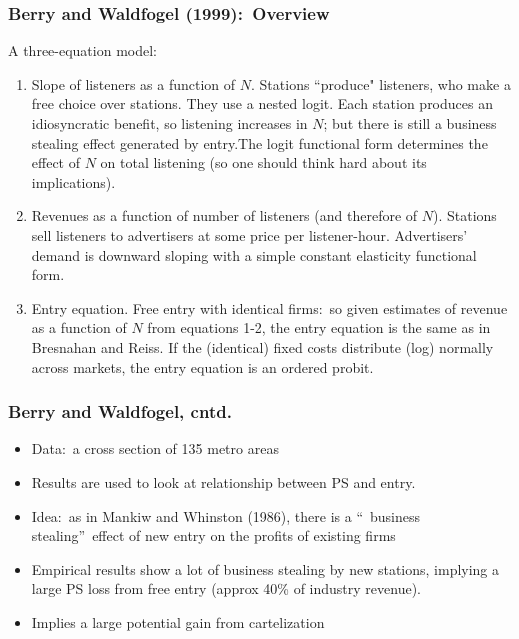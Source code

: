 \documentclass[aspectratio=169,11pt]{beamer}
\begin{document}
\begin{frame}
\frametitle{Berry and Waldfogel (1999):\ Overview}

A three-equation model:

\begin{enumerate}
\item Slope of listeners as a function of $N.$ Stations ``produce" listeners,
who make a free choice over stations. They use a nested logit. Each station
produces an idiosyncratic benefit, so listening increases in $N$; but there
is still a business stealing effect generated by entry.The logit functional
form determines the effect of $N$ on total listening (so one should think
hard about its implications).

\item Revenues as a function of number of listeners (and therefore of $N$).
Stations sell listeners to advertisers at some price per listener-hour.
Advertisers' demand is downward sloping with a simple constant elasticity
functional form.

\item Entry equation. Free entry with identical firms:\ so given estimates
of revenue as a function of $N$ from equations 1-2, the entry equation is
the same as in Bresnahan and Reiss. If the
(identical) fixed costs distribute (log) normally across markets, the entry
equation is an ordered probit.
\end{enumerate}
\end{frame}



\begin{frame}
\frametitle{Berry and Waldfogel, cntd.}
\begin{itemize}
\item Data:\ a cross section of 135 metro areas
\item Results are used to look at relationship between PS and entry.
\item Idea:\ as in Mankiw and Whinston (1986), there is a \textquotedblleft\
business stealing\textquotedblright\ effect of new entry on the profits of
existing firms
\item Empirical results show a lot of business stealing by new stations,
implying a large PS loss from free entry (approx 40\% of industry revenue).
\item Implies a large potential gain from cartelization
\end{itemize}
\end{frame}
\end{document}
